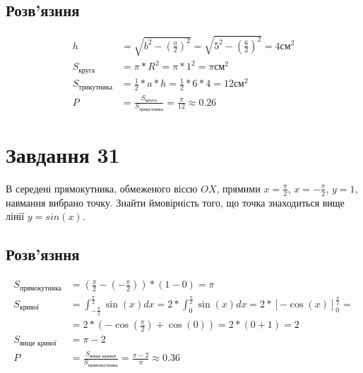 \documentclass{article}
\begin{document}
\subsection*{Розв'язння}

\begin{align*}
	h                   & = \sqrt{b^2 - (\frac{a}{2})^2} = \sqrt{5^2 - (\frac{6}{2})^2} = 4 \text{см}^2 \\
	S_\text{круга}      & = \pi * R^2 = \pi * 1^2 = \pi \text{см}^2                                     \\
	S_\text{трикутника} & = \frac{1}{2} * a * h = \frac{1}{2} * 6 * 4 = 12 \text{см}^2                  \\
	P                   & = \frac{S_\text{круга}}{S_\text{трикутника}} = \frac{\pi}{12} \approx 0.26
\end{align*}

\section{Завдання 31}

В середені прямокутника, обмеженого віссю $OX$,
прямими $x = \frac{\pi}{2}$, $x = -\frac{\pi}{2}$, $y = 1$,
навмання вибрано точку. Знайти ймовірність того,
що точка знаходиться вище лінії $y = sin(x)$.

\subsection*{Розв'язння}


\begin{align*}
	S_\text{прямокутника} & = (\frac{\pi}{2} - (-\frac{\pi}{2})) * (1 - 0) = \pi \\
	S_\text{кривої}       & = \int_{-\frac{\pi}{2}}^{\frac{\pi}{2}} \sin(x)dx
	= 2 * \int_{0}^{\frac{\pi}{2}} \sin(x)dx
	= 2 * [-\cos(x)]_{0}^{\frac{\pi}{2}} =                                       \\
	                      & = 2 * (-\cos(\frac{\pi}{2}) + \cos(0))
	= 2 * (0 + 1) = 2                                                            \\
	S_\text{вище кривої}  & = \pi - 2                                            \\
	P                     & = \frac{S_\text{вище кривої}}{S_\text{прямокутника}}
	= \frac{\pi - 2}{\pi} \approx 0.36
\end{align*}
\end{document}
